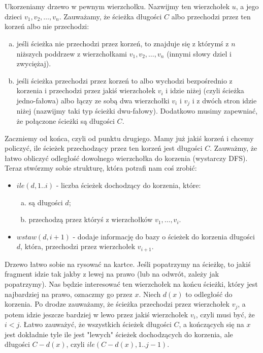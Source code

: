 \section{} %

Ukorzeniamy drzewo w pewnym wierzchołku. Nazwijmy ten wierzchołek $u$, a jego dzieci $v_1, v_2, \ldots , v_n$. Zauważamy, że ścieżka długości $C$ albo przechodzi przez ten korzeń albo nie przechodzi:

\begin{enumerate}[a)]
\item jeśli ścieżka nie przechodzi przez korzeń, to znajduje się z którymś z $n$ niższych poddrzew z wierzchołkami $v_1, v_2, \ldots, v_n$ (innymi słowy dziel i zwyciężaj).

\item jeśli ścieżka przechodzi przez korzeń to albo wychodzi bezpośrednio z korzenia i przechodzi przez jakiś wierzchołek $v_i$ i idzie niżej (czyli ścieżka jedno-fałowa) albo łączy ze sobą dwa wierzchołki $v_i$ i $v_j$ i z dwóch stron idzie niżej (nazwijmy taki typ ścieżki dwu-fałowy). Dodatkowo musimy zapewniać, że połączone ścieżki są długości $C$.
\end{enumerate}

Zaczniemy od końca, czyli od punktu drugiego. Mamy już jakiś korzeń i chcemy policzyć, ile ścieżek przechodzący przez ten korzeń jest długości $C$. Zauważmy, że łatwo obliczyć odległość dowolnego wierzchołka do korzenia (wystarczy DFS). Teraz stwórzmy sobie strukturę, która potrafi nam coś zrobić:
\begin{itemize}
\item $ile(d, 1..i) $ - liczba ścieżek dochodzący do korzenia, które:
\begin{enumerate}[a)]
\item są długości $d$;
\item przechodzą przez któryś z wierzchołków $v_1, \ldots, v_i$.
\end{enumerate}

\item $wstaw(d, i+1) $ - dodaje informację do bazy o ścieżek do korzenia długości $d$, która, przechodzi przez wierzchołek $v_{i+1}$.
\end{itemize}

Drzewo łatwo sobie na rysować na kartce. Jeśli popatrzymy na ścieżkę, to jakiś fragment idzie tak jakby z lewej na prawo (lub na odwrót, zależy jak popatrzymy). Nas będzie interesować ten wierzchołek na końcu ścieżki, który jest najbardziej na prawo, oznaczmy go przez $x$. Niech $d(x)$ to odległość do korzenia. Po drodze zauważamy, że ścieżka przechodzi przez wierzchołek $v_j$, a potem idzie jeszcze bardziej w lewo przez jakiś wierzchołek $v_i$, czyli musi być, że $i<j$. Łatwo zauważyć, że wszystkich ścieżek długości $C$, a kończących się na $x$ jest dokładnie tyle ile jest "lewych" ścieżek dochodzących do korzenia, ale długości $C-d(x)$, czyli $ile(C - d(x), 1..j-1)$.



